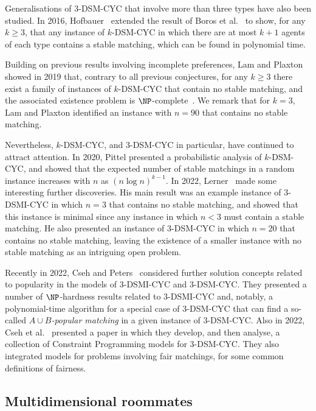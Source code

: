 Generalisations of 3-DSM-CYC that involve more than three types have also been studied. In 2016, Hofbauer~\cite{HOFBAUER201672} extended the result of Boros et al.~\cite{BGJK04} to show, for any $k \geq 3$, that any instance of $k$-DSM-CYC in which there are at most $k+1$ agents of each type contains a stable matching, which can be found in polynomial time.

Building on previous results involving incomplete preferences, Lam and Plaxton showed in 2019 that, contrary to all previous conjectures, for any $k \geq 3$ there exist a family of instances of $k$-DSM-CYC that contain no stable matching, and the associated existence problem is $\NP$-complete~\cite{Plaxton3DSMCYCJournal}. We remark that for $k=3$, Lam and Plaxton identified an instance with $n=90$ that contains no stable matching.

Nevertheless, $k$-DSM-CYC, and 3-DSM-CYC in particular, have continued to attract attention. In 2020, Pittel \cite{Pittel20} presented a probabilistic analysis of $k$-DSM-CYC, and showed that the expected number of stable matchings in a random instance increases with $n$ as $(n \log n)^{k - 1}$. In 2022, Lerner~\cite{Lerner22} made some interesting further discoveries. His main result was an example instance of 3-DSMI-CYC in which $n=3$ that contains no stable matching, and showed that this instance is minimal since any instance in which $n < 3$ must contain a stable matching. He also presented an instance of 3-DSM-CYC in which $n=20$ that contains no stable matching, leaving the existence of a smaller instance with no stable matching as an intriguing open problem.

Recently in 2022, Cseh and Peters~\cite{CsehPeters22} considered further solution concepts related to popularity in the models of 3-DSMI-CYC and 3-DSM-CYC. They presented a number of $\NP$-hardness results related to 3-DSMI-CYC and, notably, a polynomial-time algorithm for a special case of 3-DSM-CYC that can find a so-called \emph{$A\cup B$-popular matching} in a given instance of 3-DSM-CYC. Also in 2022, Cseh et al.~\cite{Cseh2022} presented a paper in which they develop, and then analyse, a collection of Constraint Programming models for 3-DSM-CYC. They also integrated models for problems involving fair matchings, for some common definitions of fairness.

\subsection{Multidimensional roommates}

